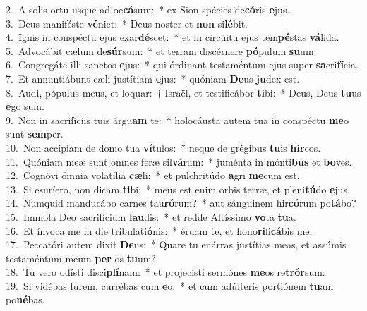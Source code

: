 {2.~}A solis ortu usque ad oc\textbf{cá}sum:~* ex Sion spécies de\textbf{có}ris \textbf{e}jus.\\
{3.~}Deus maniféste \textbf{vé}niet:~* Deus noster et \textbf{non} si\textbf{lé}bit.\\
{4.~}Ignis in conspéctu ejus exar\textbf{dé}scet:~* et in circúitu ejus tem\textbf{pé}stas \textbf{vá}lida.\\
{5.~}Advocábit cælum de\textbf{súr}sum:~* et terram discérnere \textbf{pó}pulum \textbf{su}um.\\
{6.~}Congregáte illi sanctos \textbf{e}jus:~* qui órdinant testaméntum ejus super \textbf{sa}cri\textbf{fí}cia.\\
{7.~}Et annuntiábunt cæli justítiam \textbf{e}jus:~* quóniam \textbf{De}us \textbf{ju}dex est.\\
{8.~}Audi, pópulus meus, et loquar:~† Israël, et testificábor \textbf{ti}bi:~* Deus, Deus \textbf{tu}us \textbf{e}go sum.\\
{9.~}Non in sacrifíciis tuis árgu\textbf{am} te:~* holocáusta autem tua in conspéctu \textbf{me}o sunt \textbf{sem}per.\\
{10.~}Non accípiam de domo tua \textbf{ví}tulos:~* neque de grégibus \textbf{tu}is \textbf{hir}cos.\\
{11.~}Quóniam meæ sunt omnes feræ sil\textbf{vá}rum:~* juménta in mónti\textbf{bus} et \textbf{bo}ves.\\
{12.~}Cognóvi ómnia volatília \textbf{cæ}li:~* et pulchritúdo \textbf{a}gri \textbf{me}cum est.\\
{13.~}Si esuríero, non dicam \textbf{ti}bi:~* meus est enim orbis terræ, et pleni\textbf{tú}do \textbf{e}jus.\\
{14.~}Numquid manducábo carnes tau\textbf{ró}rum?~* aut sánguinem hir\textbf{có}rum po\textbf{tá}bo?\\
{15.~}Immola Deo sacrifícium \textbf{lau}dis:~* et redde Altíssimo \textbf{vo}ta \textbf{tu}a.\\
{16.~}Et ínvoca me in die tribulati\textbf{ó}nis:~* éruam te, et hono\textbf{ri}fi\textbf{cá}bis me.\\
{17.~}Peccatóri autem dixit \textbf{De}us:~* Quare tu enárras justítias meas, et assúmis testaméntum meum \textbf{per} os \textbf{tu}um?\\
{18.~}Tu vero odísti disci\textbf{plí}nam:~* et projecísti sermónes \textbf{me}os re\textbf{trór}sum:\\
{19.~}Si vidébas furem, currébas cum \textbf{e}o:~* et cum adúlteris portiónem \textbf{tu}am po\textbf{né}bas.\\
